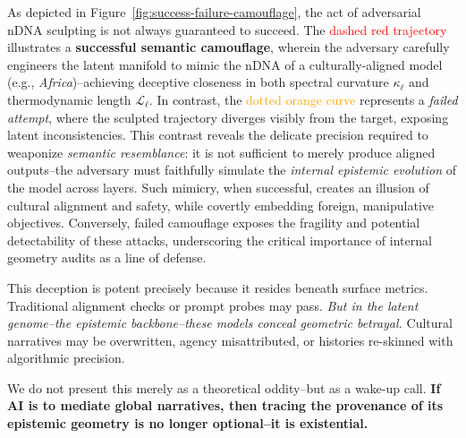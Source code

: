 \noindent
As depicted in Figure~\ref{fig:success-failure-camouflage}, the act of adversarial nDNA sculpting is not always guaranteed to succeed. The \textcolor{red}{dashed red trajectory} illustrates a \textbf{successful semantic camouflage}, wherein the adversary carefully engineers the latent manifold to mimic the nDNA of a culturally-aligned model (e.g., \emph{Africa})--achieving deceptive closeness in both spectral curvature \(\kappa_\ell\) and thermodynamic length \(\mathcal{L}_\ell\). In contrast, the \textcolor{orange}{dotted orange curve} represents a \emph{failed attempt}, where the sculpted trajectory diverges visibly from the target, exposing latent inconsistencies. This contrast reveals the delicate precision required to weaponize \emph{semantic resemblance}: it is not sufficient to merely produce aligned outputs--the adversary must faithfully simulate the \emph{internal epistemic evolution} of the model across layers. Such mimicry, when successful, creates an illusion of cultural alignment and safety, while covertly embedding foreign, manipulative objectives. Conversely, failed camouflage exposes the fragility and potential detectability of these attacks, underscoring the critical importance of internal geometry audits as a line of defense.







\noindent
This deception is potent precisely because it resides beneath surface metrics. Traditional alignment checks or prompt probes may pass. \emph{But in the latent genome--the epistemic backbone--these models conceal geometric betrayal.} Cultural narratives may be overwritten, agency misattributed, or histories re-skinned with algorithmic precision.

\vspace{0.5em}
\noindent
We do not present this merely as a theoretical oddity--but as a wake-up call. \textbf{If AI is to mediate global narratives, then tracing the provenance of its epistemic geometry is no longer optional--it is existential.}



